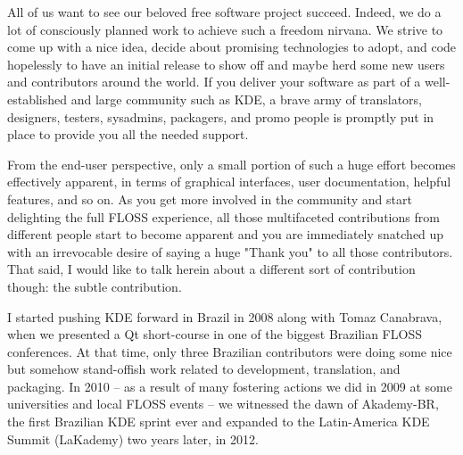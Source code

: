 

\noindent{}All of us want to see our beloved free software project succeed. Indeed, we do a lot of consciously planned work to achieve such a freedom nirvana. We strive to come up with a nice idea, decide about promising technologies to adopt, and code hopelessly to have an initial release to show off and maybe herd some new users and contributors around the world. If you deliver your software as part of a well-established and large community such as KDE, a brave army of translators, designers, testers, sysadmins, packagers, and promo people is promptly put in place to provide you all the needed support.

From the end-user perspective, only a small portion of such a huge effort becomes effectively apparent, in terms of graphical interfaces, user documentation, helpful features, and so on. As you get more involved in the community and start delighting the full FLOSS experience, all those multifaceted contributions from different people start to become apparent and you are immediately snatched up with an irrevocable desire of saying a huge "Thank you" to all those contributors. That said, I would like to talk herein about a different sort of contribution though: the subtle contribution.

I started pushing KDE forward in Brazil in 2008 along with Tomaz Canabrava, when we presented a Qt short-course in one of the biggest Brazilian FLOSS conferences. At that time, only three Brazilian contributors were doing some nice but somehow stand-offish work related to development, translation, and packaging. In 2010 -- as a result of many fostering actions we did in 2009 at some universities and local FLOSS events -- we witnessed the dawn of Akademy-BR, the first Brazilian KDE sprint ever and expanded to the Latin-America KDE Summit (LaKademy) two years later, in 2012.

